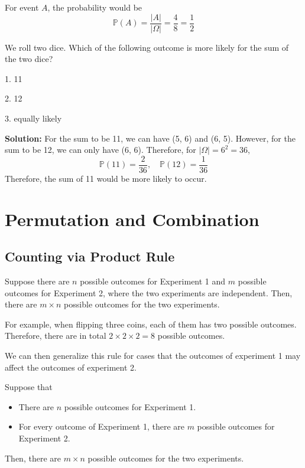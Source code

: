 For event \(A\), the probability would be 
\[
    \mathbb{P}(A) = \dfrac{\vert A \vert}{\vert \Omega \vert} = \dfrac{4}{8} = \dfrac{1}{2}
\]

\begin{eg}
We roll two dice. Which of the following outcome is more likely for the sum of the two dice?

1. 11

2. 12

3. equally likely

\textbf{Solution:} 
For the sum to be 11, we can have (5, 6) and (6, 5). However, for the sum to be 12, we can only have (6, 6). Therefore, for \(\vert \Omega \vert = 6^2 = 36\),
\[
    \mathbb{P}(11) = \dfrac{2}{36},\quad\mathbb{P}(12) = \dfrac{1}{36}
\]
Therefore, the sum of 11 would be more likely to occur. 
\end{eg}

\section{Permutation and Combination}

\subsection{Counting via Product Rule}
\begin{proposition}
    Suppose there are \(n\) possible outcomes for Experiment 1 and \(m\) possible outcomes for Experiment 2, where the two experiments are independent. Then, there are \(m \times n\) possible outcomes for the two experiments.
\end{proposition}

For example, when flipping three coins, each of them has two possible outcomes. Therefore, there are in total \(2 \times 2 \times 2 = 8\) possible outcomes. 

We can then generalize this rule for cases that the outcomes of experiment 1 may affect the outcomes of experiment 2.
\begin{proposition}
    Suppose that
    \begin{itemize}
        \item There are \(n\) possible outcomes for Experiment 1. 
        \item For every outcome of Experiment 1, there are \(m\) possible outcomes for Experiment 2.
    \end{itemize}
    Then, there are \(m \times n\) possible outcomes for the two experiments.
\end{proposition}

